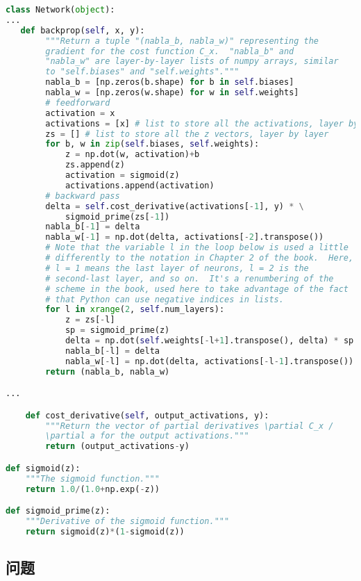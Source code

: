 \begin{lstlisting}[language=Python]
class Network(object):
...
   def backprop(self, x, y):
        """Return a tuple "(nabla_b, nabla_w)" representing the
        gradient for the cost function C_x.  "nabla_b" and
        "nabla_w" are layer-by-layer lists of numpy arrays, similar
        to "self.biases" and "self.weights"."""
        nabla_b = [np.zeros(b.shape) for b in self.biases]
        nabla_w = [np.zeros(w.shape) for w in self.weights]
        # feedforward
        activation = x
        activations = [x] # list to store all the activations, layer by layer
        zs = [] # list to store all the z vectors, layer by layer
        for b, w in zip(self.biases, self.weights):
            z = np.dot(w, activation)+b
            zs.append(z)
            activation = sigmoid(z)
            activations.append(activation)
        # backward pass
        delta = self.cost_derivative(activations[-1], y) * \
            sigmoid_prime(zs[-1])
        nabla_b[-1] = delta
        nabla_w[-1] = np.dot(delta, activations[-2].transpose())
        # Note that the variable l in the loop below is used a little
        # differently to the notation in Chapter 2 of the book.  Here,
        # l = 1 means the last layer of neurons, l = 2 is the
        # second-last layer, and so on.  It's a renumbering of the
        # scheme in the book, used here to take advantage of the fact
        # that Python can use negative indices in lists.
        for l in xrange(2, self.num_layers):
            z = zs[-l]
            sp = sigmoid_prime(z)
            delta = np.dot(self.weights[-l+1].transpose(), delta) * sp
            nabla_b[-l] = delta
            nabla_w[-l] = np.dot(delta, activations[-l-1].transpose())
        return (nabla_b, nabla_w)

...

    def cost_derivative(self, output_activations, y):
        """Return the vector of partial derivatives \partial C_x /
        \partial a for the output activations."""
        return (output_activations-y) 

def sigmoid(z):
    """The sigmoid function."""
    return 1.0/(1.0+np.exp(-z))

def sigmoid_prime(z):
    """Derivative of the sigmoid function."""
    return sigmoid(z)*(1-sigmoid(z))
\end{lstlisting}

\subsection*{问题}

